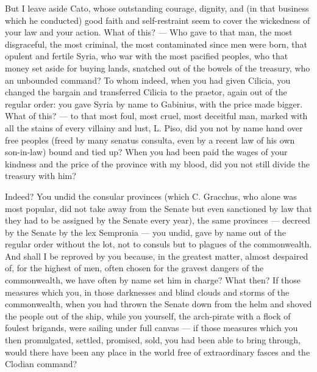  But I leave aside Cato, whose outstanding courage, dignity, and (in that business which he conducted) good faith and self-restraint seem to cover the wickedness of your law and your action. What of this? --- Who gave to that man, the most disgraceful, the most criminal, the most contaminated since men were born, that opulent and fertile Syria, who war with the most pacified peoples, who that money set aside for buying lands, snatched out of the bowels of the treasury, who an unbounded command? To whom indeed, when you had given Cilicia, you changed the bargain and transferred Cilicia to the praetor, again out of the regular order: you gave Syria by name to Gabinius, with the price made bigger. What of this? --- to that most foul, most cruel, most deceitful man, marked with all the stains of every villainy and lust, L. Piso, did you not by name hand over free peoples (freed by many senatus consulta, even by a recent law of his own son-in-law) bound and tied up? When you had been paid the wages of your kindness and the price of the province with my blood, did you not still divide the treasury with him?

 Indeed? You undid the consular provinces (which C. Gracchus, who alone was most popular, did not take away from the Senate but even sanctioned by law that they had to be assigned by the Senate every year), the same provinces --- decreed by the Senate by the lex Sempronia --- you undid, gave by name out of the regular order without the lot, not to consuls but to plagues of the commonwealth. And shall I be reproved by you because, in the greatest matter, almost despaired of, for the highest of men, often chosen for the gravest dangers of the commonwealth, we have often by name set him in charge? What then? If those measures which you, in those darknesses and blind clouds and storms of the commonwealth, when you had thrown the Senate down from the helm and shoved the people out of the ship, while you yourself, the arch-pirate with a flock of foulest brigands, were sailing under full canvas --- if those measures which you then promulgated, settled, promised, sold, you had been able to bring through, would there have been any place in the world free of extraordinary fasces and the Clodian command?


